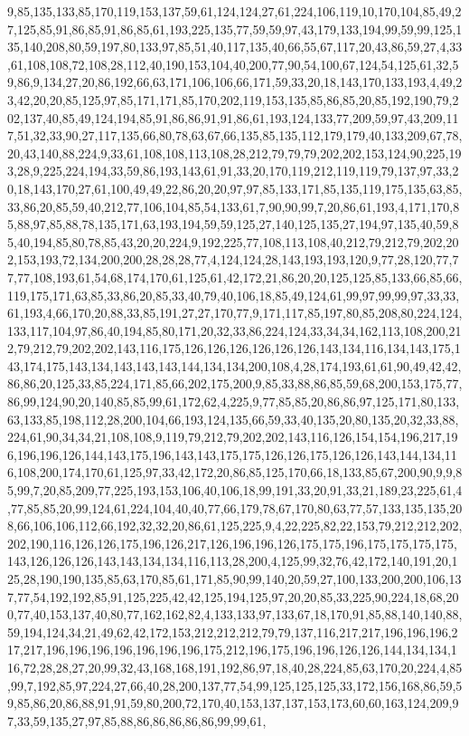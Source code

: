9,85,135,133,85,170,119,153,137,59,61,124,124,27,61,224,106,119,10,170,104,85,49,27,125,85,91,86,85,91,86,85,61,193,225,135,77,59,59,97,43,179,133,194,99,59,99,125,135,140,208,80,59,197,80,133,97,85,51,40,117,135,40,66,55,67,117,20,43,86,59,27,4,33,61,108,108,72,108,28,112,40,190,153,104,40,200,77,90,54,100,67,124,54,125,61,32,59,86,9,134,27,20,86,192,66,63,171,106,106,66,171,59,33,20,18,143,170,133,193,4,49,23,42,20,20,85,125,97,85,171,171,85,170,202,119,153,135,85,86,85,20,85,192,190,79,202,137,40,85,49,124,194,85,91,86,86,91,91,86,61,193,124,133,77,209,59,97,43,209,117,51,32,33,90,27,117,135,66,80,78,63,67,66,135,85,135,112,179,179,40,133,209,67,78,20,43,140,88,224,9,33,61,108,108,113,108,28,212,79,79,79,202,202,153,124,90,225,193,28,9,225,224,194,33,59,86,193,143,61,91,33,20,170,119,212,119,119,79,137,97,33,20,18,143,170,27,61,100,49,49,22,86,20,20,97,97,85,133,171,85,135,119,175,135,63,85,33,86,20,85,59,40,212,77,106,104,85,54,133,61,7,90,90,99,7,20,86,61,193,4,171,170,85,88,97,85,88,78,135,171,63,193,194,59,59,125,27,140,125,135,27,194,97,135,40,59,85,40,194,85,80,78,85,43,20,20,224,9,192,225,77,108,113,108,40,212,79,212,79,202,202,153,193,72,134,200,200,28,28,28,77,4,124,124,28,143,193,193,120,9,77,28,120,77,77,77,108,193,61,54,68,174,170,61,125,61,42,172,21,86,20,20,125,125,85,133,66,85,66,119,175,171,63,85,33,86,20,85,33,40,79,40,106,18,85,49,124,61,99,97,99,99,97,33,33,61,193,4,66,170,20,88,33,85,191,27,27,170,77,9,171,117,85,197,80,85,208,80,224,124,133,117,104,97,86,40,194,85,80,171,20,32,33,86,224,124,33,34,34,162,113,108,200,212,79,212,79,202,202,143,116,175,126,126,126,126,126,126,143,134,116,134,143,175,143,174,175,143,134,143,143,143,144,134,134,200,108,4,28,174,193,61,61,90,49,42,42,86,86,20,125,33,85,224,171,85,66,202,175,200,9,85,33,88,86,85,59,68,200,153,175,77,86,99,124,90,20,140,85,85,99,61,172,62,4,225,9,77,85,85,20,86,86,97,125,171,80,133,63,133,85,198,112,28,200,104,66,193,124,135,66,59,33,40,135,20,80,135,20,32,33,88,224,61,90,34,34,21,108,108,9,119,79,212,79,202,202,143,116,126,154,154,196,217,196,196,196,126,144,143,175,196,143,143,175,175,126,126,175,126,126,143,144,134,116,108,200,174,170,61,125,97,33,42,172,20,86,85,125,170,66,18,133,85,67,200,90,9,9,85,99,7,20,85,209,77,225,193,153,106,40,106,18,99,191,33,20,91,33,21,189,23,225,61,4,77,85,85,20,99,124,61,224,104,40,40,77,66,179,78,67,170,80,63,77,57,133,135,135,208,66,106,106,112,66,192,32,32,20,86,61,125,225,9,4,22,225,82,22,153,79,212,212,202,202,190,116,126,126,175,196,126,217,126,196,196,126,175,175,196,175,175,175,175,143,126,126,126,143,143,134,134,116,113,28,200,4,125,99,32,76,42,172,140,191,20,125,28,190,190,135,85,63,170,85,61,171,85,90,99,140,20,59,27,100,133,200,200,106,137,77,54,192,192,85,91,125,225,42,42,125,194,125,97,20,20,85,33,225,90,224,18,68,200,77,40,153,137,40,80,77,162,162,82,4,133,133,97,133,67,18,170,91,85,88,140,140,88,59,194,124,34,21,49,62,42,172,153,212,212,212,79,79,137,116,217,217,196,196,196,217,217,196,196,196,196,196,196,196,175,212,196,175,196,196,126,126,144,134,134,116,72,28,28,27,20,99,32,43,168,168,191,192,86,97,18,40,28,224,85,63,170,20,224,4,85,99,7,192,85,97,224,27,66,40,28,200,137,77,54,99,125,125,125,33,172,156,168,86,59,59,85,86,20,86,88,91,91,59,80,200,72,170,40,153,137,137,153,173,60,60,163,124,209,97,33,59,135,27,97,85,88,86,86,86,86,86,99,99,61,
